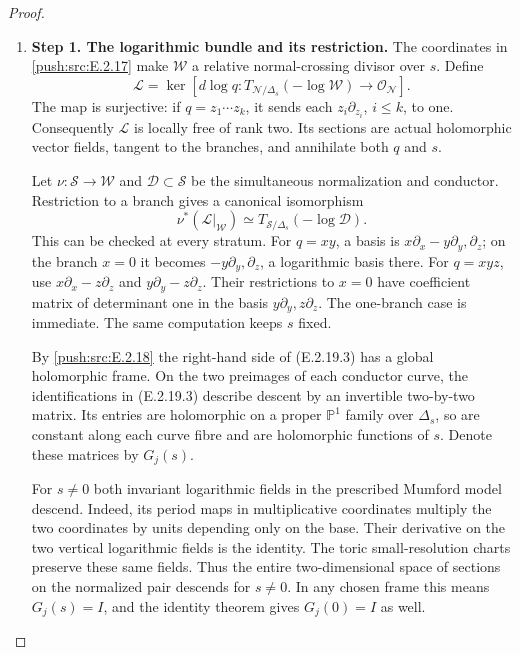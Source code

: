 \begin{proof}
\begin{enumerate}[label={$\langle1\rangle$\arabic*.},leftmargin=*]
\item 
\noindent\textbf{Step 1. The logarithmic bundle and its restriction.}
The coordinates in \ref{push:src:E.2.17} make $\mathcal W$ a
relative normal-crossing divisor over $s$.
Define
\[
 \mathcal L=
 \ker\left[
 d\log q:
 T_{\mathcal N/\Delta_s}(-\log\mathcal W)
       \longrightarrow\mathcal O_{\mathcal N}
 \right].
 \tag{E.2.19.2}
\]
The map is surjective: if
$q=z_1\cdots z_k$, it sends each
$z_i\partial_{z_i}$, $i\leq k$, to one.
Consequently $\mathcal L$ is locally free of
rank two.  Its sections are actual holomorphic
vector fields, tangent to the branches, and
annihilate both $q$ and $s$.

Let $\nu:\mathcal S\to\mathcal W$ and
$\mathcal D\subset\mathcal S$ be the
simultaneous normalization and conductor.
Restriction to a branch gives a canonical
isomorphism
\[
 \nu^*(\mathcal L|_{\mathcal W})
 \simeq T_{\mathcal S/\Delta_s}(-\log\mathcal D).
 \tag{E.2.19.3}
\]
This can be checked at every stratum.  For
$q=xy$, a basis is
$x\partial_x-y\partial_y,\partial_z$;
on the branch $x=0$ it becomes
$-y\partial_y,\partial_z$, a logarithmic
basis there.  For $q=xyz$, use
$x\partial_x-z\partial_z$ and
$y\partial_y-z\partial_z$.  Their
restrictions to $x=0$ have coefficient
matrix of determinant one in the basis
$y\partial_y,z\partial_z$.
The one-branch case is immediate.
The same computation keeps $s$ fixed.

By \ref{push:src:E.2.18} the right-hand side of
(E.2.19.3) has a global holomorphic
frame.  On the two preimages of each
conductor curve, the identifications
in (E.2.19.3) describe descent by an
invertible two-by-two matrix.  Its
entries are holomorphic on a proper
$\mathbb P^1$ family over $\Delta_s$,
so are constant along each curve
fibre and are holomorphic functions
of $s$.  Denote these matrices by
$G_j(s)$.

For $s\ne0$ both invariant logarithmic
fields in the prescribed Mumford model
descend.  Indeed, its period maps in
multiplicative coordinates multiply
the two coordinates by units depending
only on the base.  Their derivative
on the two vertical logarithmic
fields is the identity.  The toric
small-resolution charts preserve
these same fields.  Thus the entire
two-dimensional space of sections
on the normalized pair descends for
$s\ne0$.  In any chosen frame this
means $G_j(s)=I$, and the identity
theorem gives $G_j(0)=I$ as well.


\end{enumerate}
\end{proof}

